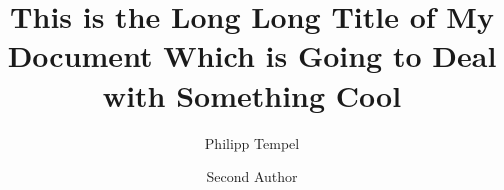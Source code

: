 \documentclass[%
  draft,%
  oneside,%
  ngerman,%
]{iswartcl}
\author{Philipp Tempel \and Second Author}
\date{\printdate{2017-10-02}}
\title{This is the Long Long Title of My Document Which is Going to Deal with Something Cool}
\begin{document}
\frontmatter



\maketitle



\begin{abstract}
  \Blindtext[2][1]
\end{abstract}




\tableofcontents

\listoffigures

\listoftables





\mainmatter




\Blinddocument

\end{document}
